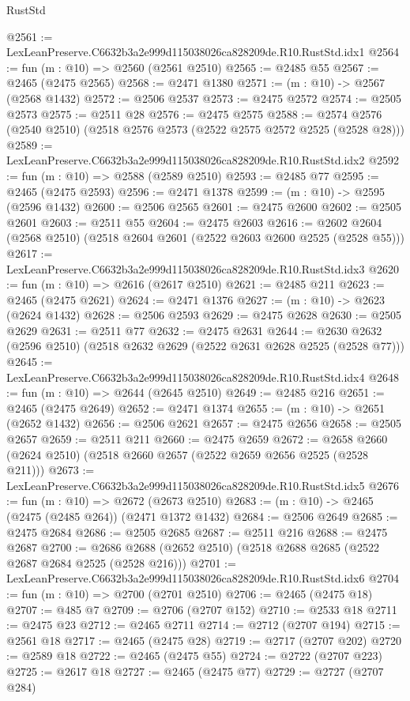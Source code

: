 \begin{lexlean}{RustStd}
\begin{coremodule}
@2561 := LexLeanPreserve.C6632b3a2e999d115038026ca828209de.R10.RustStd.idx1
@2564 := fun (m : @10) => @2560 (@2561 @2510)
@2565 := @2485 @55
@2567 := @2465 (@2475 @2565)
@2568 := @2471 @1380
@2571 := (m : @10) -> @2567 (@2568 @1432)
@2572 := @2506 @2537
@2573 := @2475 @2572
@2574 := @2505 @2573
@2575 := @2511 @28
@2576 := @2475 @2575
@2588 := @2574 @2576 (@2540 @2510) (@2518 @2576 @2573 (@2522 @2575 @2572 @2525 (@2528 @28)))
@2589 := LexLeanPreserve.C6632b3a2e999d115038026ca828209de.R10.RustStd.idx2
@2592 := fun (m : @10) => @2588 (@2589 @2510)
@2593 := @2485 @77
@2595 := @2465 (@2475 @2593)
@2596 := @2471 @1378
@2599 := (m : @10) -> @2595 (@2596 @1432)
@2600 := @2506 @2565
@2601 := @2475 @2600
@2602 := @2505 @2601
@2603 := @2511 @55
@2604 := @2475 @2603
@2616 := @2602 @2604 (@2568 @2510) (@2518 @2604 @2601 (@2522 @2603 @2600 @2525 (@2528 @55)))
@2617 := LexLeanPreserve.C6632b3a2e999d115038026ca828209de.R10.RustStd.idx3
@2620 := fun (m : @10) => @2616 (@2617 @2510)
@2621 := @2485 @211
@2623 := @2465 (@2475 @2621)
@2624 := @2471 @1376
@2627 := (m : @10) -> @2623 (@2624 @1432)
@2628 := @2506 @2593
@2629 := @2475 @2628
@2630 := @2505 @2629
@2631 := @2511 @77
@2632 := @2475 @2631
@2644 := @2630 @2632 (@2596 @2510) (@2518 @2632 @2629 (@2522 @2631 @2628 @2525 (@2528 @77)))
@2645 := LexLeanPreserve.C6632b3a2e999d115038026ca828209de.R10.RustStd.idx4
@2648 := fun (m : @10) => @2644 (@2645 @2510)
@2649 := @2485 @216
@2651 := @2465 (@2475 @2649)
@2652 := @2471 @1374
@2655 := (m : @10) -> @2651 (@2652 @1432)
@2656 := @2506 @2621
@2657 := @2475 @2656
@2658 := @2505 @2657
@2659 := @2511 @211
@2660 := @2475 @2659
@2672 := @2658 @2660 (@2624 @2510) (@2518 @2660 @2657 (@2522 @2659 @2656 @2525 (@2528 @211)))
@2673 := LexLeanPreserve.C6632b3a2e999d115038026ca828209de.R10.RustStd.idx5
@2676 := fun (m : @10) => @2672 (@2673 @2510)
@2683 := (m : @10) -> @2465 (@2475 (@2485 @264)) (@2471 @1372 @1432)
@2684 := @2506 @2649
@2685 := @2475 @2684
@2686 := @2505 @2685
@2687 := @2511 @216
@2688 := @2475 @2687
@2700 := @2686 @2688 (@2652 @2510) (@2518 @2688 @2685 (@2522 @2687 @2684 @2525 (@2528 @216)))
@2701 := LexLeanPreserve.C6632b3a2e999d115038026ca828209de.R10.RustStd.idx6
@2704 := fun (m : @10) => @2700 (@2701 @2510)
@2706 := @2465 (@2475 @18)
@2707 := @485 @7
@2709 := @2706 (@2707 @152)
@2710 := @2533 @18
@2711 := @2475 @23
@2712 := @2465 @2711
@2714 := @2712 (@2707 @194)
@2715 := @2561 @18
@2717 := @2465 (@2475 @28)
@2719 := @2717 (@2707 @202)
@2720 := @2589 @18
@2722 := @2465 (@2475 @55)
@2724 := @2722 (@2707 @223)
@2725 := @2617 @18
@2727 := @2465 (@2475 @77)
@2729 := @2727 (@2707 @284)

\end{coremodule}
\end{lexlean}
